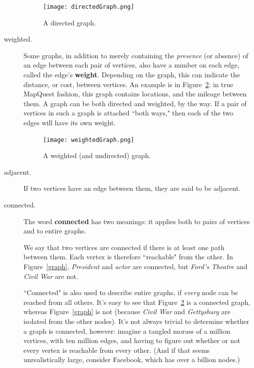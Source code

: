 \begin{description}
\begin{figure}[ht]
\centering
\texttt{[image: directedGraph.png]}
\caption{A directed graph.}
\label{directedGraph}
\end{figure}

\item[weighted.] Some graphs, in addition to merely containing the
\textit{presence} (or absence) of an edge between each pair of vertices,
also have a number on each edge, called the edge's \textbf{weight}.
Depending on the graph, this can indicate the distance, or cost, between
vertices. An example is in Figure~\ref{weightedGraph}: in true MapQuest
fashion, this graph contains locations, and the mileage between them. A
graph can be both directed and weighted, by the way. If a pair of vertices
in such a graph is attached ``both ways," then each of the two edges will
have its own weight.

\begin{figure}[ht]
\centering
\texttt{[image: weightedGraph.png]}
\caption{A weighted (and undirected) graph.}
\label{weightedGraph}
\end{figure}

\item[adjacent.] If two vertices have an edge between them, they are said
to be adjacent.

\item[connected.] The word \textbf{connected} has two meanings: it applies
both to pairs of vertices and to entire graphs.

We say that two vertices are connected if there is at least one path
between them. Each vertex is therefore ``reachable" from the other.  In
Figure~\ref{graph}, \textsl{President} and \textsl{actor} are connected,
but \textsl{Ford's Theatre} and \textsl{Civil War} are not.

``Connected" is also used to describe entire graphs, if \textit{every}
node can be reached from all others. It's easy to see that
Figure~\ref{weightedGraph} is a connected graph, whereas Figure~\ref{graph}
is not (because \textsl{Civil War} and \textsl{Gettysburg} are isolated
from the other nodes). It's not always trivial to determine whether a graph
is connected, however: imagine a tangled morass of a million vertices, with
ten million edges, and having to figure out whether or not every vertex is
reachable from every other. (And if that seems unrealistically large,
consider Facebook, which has over a billion nodes.)


\end{description}
